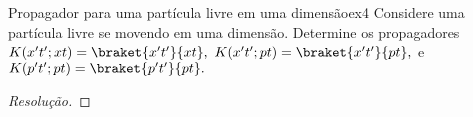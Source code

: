 \begin{exercício}{Propagador para uma partícula livre em uma dimensão}{ex4}
   Considere uma partícula livre se movendo em uma dimensão. Determine os propagadores \(K(x't'; xt) = \braket{x't'}{xt},\) \(K(x't'; pt) = \braket{x't'}{pt},\) e \(K(p't'; pt) = \braket{p't'}{pt}.\)
\end{exercício}
\begin{proof}[Resolução]
    
\end{proof}
